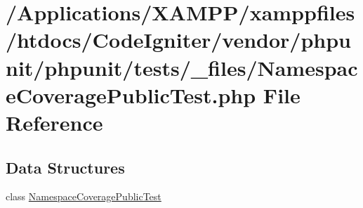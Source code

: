 \hypertarget{phpunit_2tests_2__files_2_namespace_coverage_public_test_8php}{}\section{/\+Applications/\+X\+A\+M\+P\+P/xamppfiles/htdocs/\+Code\+Igniter/vendor/phpunit/phpunit/tests/\+\_\+files/\+Namespace\+Coverage\+Public\+Test.php File Reference}
\label{phpunit_2tests_2__files_2_namespace_coverage_public_test_8php}
\subsection*{Data Structures}
\begin{DoxyCompactItemize}
\item 
class \mbox{\hyperlink{class_namespace_coverage_public_test}{Namespace\+Coverage\+Public\+Test}}
\end{DoxyCompactItemize}
